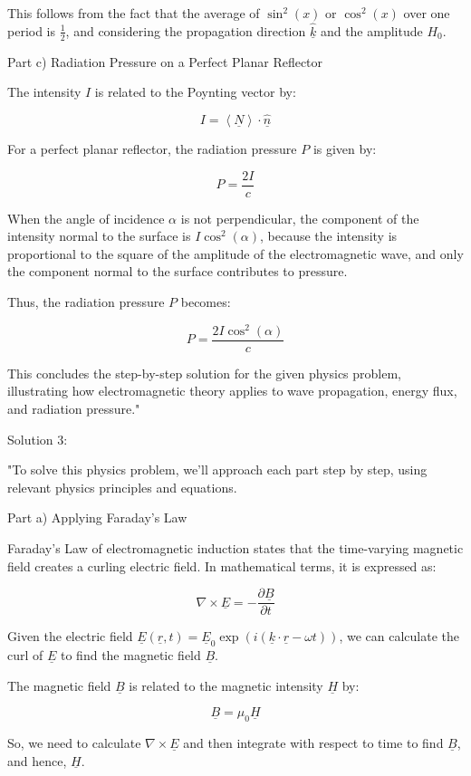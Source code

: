 This follows from the fact that the average of \(\sin^2(x)\) or \(\cos^2(x)\) over one period is \(\frac{1}{2}\), and considering the propagation direction \(\hat{\underline{k}}\) and the amplitude \(H_{0}\).

Part c) Radiation Pressure on a Perfect Planar Reflector

The intensity \(I\) is related to the Poynting vector by:

\[
I = \left< \underline{N} \right> \cdot \hat{\underline{n}}
\]

For a perfect planar reflector, the radiation pressure \(P\) is given by:

\[
P = \frac{2I}{c}
\]

When the angle of incidence \(\alpha\) is not perpendicular, the component of the intensity normal to the surface is \(I \cos^2(\alpha)\), because the intensity is proportional to the square of the amplitude of the electromagnetic wave, and only the component normal to the surface contributes to pressure.

Thus, the radiation pressure \(P\) becomes:

\[
P = \frac{2I\cos^2(\alpha)}{c}
\]

This concludes the step-by-step solution for the given physics problem, illustrating how electromagnetic theory applies to wave propagation, energy flux, and radiation pressure."

Solution 3: 

"To solve this physics problem, we'll approach each part step by step, using relevant physics principles and equations.

Part a) Applying Faraday's Law

Faraday's Law of electromagnetic induction states that the time-varying magnetic field creates a curling electric field. In mathematical terms, it is expressed as:

\[
\nabla \times \underline{E} = - \frac{\partial \underline{B}}{\partial t}
\]

Given the electric field \(\underline{E}(\underline{r}, t) = \underline{E}_{0} \exp (i(\underline{k} \cdot \underline{r} - \omega t))\), we can calculate the curl of \(\underline{E}\) to find the magnetic field \(\underline{B}\).

The magnetic field \(\underline{B}\) is related to the magnetic intensity \(\underline{H}\) by:

\[
\underline{B} = \mu_{0} \underline{H}
\]

So, we need to calculate \(\nabla \times \underline{E}\) and then integrate with respect to time to find \(\underline{B}\), and hence, \(\underline{H}\).

